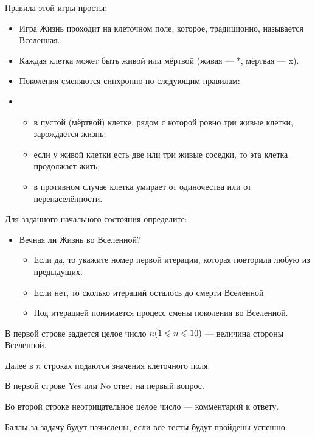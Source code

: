 
Правила этой игры просты:

\begin{itemize}
    \item Игра Жизнь проходит на клеточном поле, которое, традиционно, называется Вселенная.
    \item Каждая клетка может быть живой или мёртвой (живая — *, мёртвая — x).
    \item Поколения сменяются синхронно по следующим правилам:
    \item \begin{itemize}
        \item в пустой (мёртвой) клетке, рядом с которой ровно три живые клетки, зарождается жизнь;
        \item если у живой клетки есть две или три живые соседки, то эта клетка продолжает жить;
        \item в противном случае клетка умирает от одиночества или от перенаселённости.
    \end{itemize}
\end{itemize}

Для заданного начального состояния определите:

\begin{itemize}
    \item Вечная ли Жизнь во Вселенной?
    \begin{itemize}
        \item Если да, то укажите номер первой итерации, которая повторила любую из предыдущих.
        \item Если нет, то сколько итераций осталось до смерти Вселенной
        \item Под итерацией понимается процесс смены поколения во Вселенной.
    \end{itemize}
\end{itemize}

В первой строке задается целое число $n \space(1\leq n \leq 10)$  — величина стороны Вселенной.

Далее в $n$ строках подаются значения клеточного поля.

\outputfmtSection
В первой строке Yes или No ответ на первый вопрос.

Во второй строке неотрицательное целое число — комментарий к ответу.

\markSection

Баллы за задачу будут начислены, если все тесты будут пройдены успешно.

